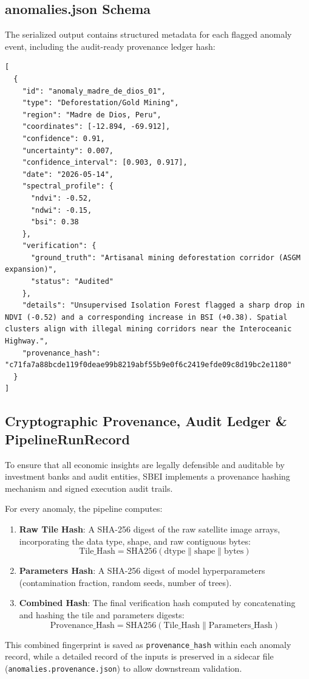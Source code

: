 \subsection{anomalies.json Schema}
The serialized output contains structured metadata for each flagged anomaly event, including the audit-ready provenance ledger hash:
\begin{verbatim}
[
  {
    "id": "anomaly_madre_de_dios_01",
    "type": "Deforestation/Gold Mining",
    "region": "Madre de Dios, Peru",
    "coordinates": [-12.894, -69.912],
    "confidence": 0.91,
    "uncertainty": 0.007,
    "confidence_interval": [0.903, 0.917],
    "date": "2026-05-14",
    "spectral_profile": {
      "ndvi": -0.52,
      "ndwi": -0.15,
      "bsi": 0.38
    },
    "verification": {
      "ground_truth": "Artisanal mining deforestation corridor (ASGM expansion)",
      "status": "Audited"
    },
    "details": "Unsupervised Isolation Forest flagged a sharp drop in NDVI (-0.52) and a corresponding increase in BSI (+0.38). Spatial clusters align with illegal mining corridors near the Interoceanic Highway.",
    "provenance_hash": "c71fa7a88bcde119f0deae99b8219abf55b9e0f6c2419efde09c8d19bc2e1180"
  }
]
\end{verbatim}

\subsection{Cryptographic Provenance, Audit Ledger \& PipelineRunRecord}
To ensure that all economic insights are legally defensible and auditable by investment banks and audit entities, SBEI implements a provenance hashing mechanism and signed execution audit trails. 

For every anomaly, the pipeline computes:
\begin{enumerate}
  \item \textbf{Raw Tile Hash}: A SHA-256 digest of the raw satellite image arrays, incorporating the data type, shape, and raw contiguous bytes:
   $$\text{Tile\_Hash} = \text{SHA256}(\text{dtype} \parallel \text{shape} \parallel \text{bytes})$$
  \item \textbf{Parameters Hash}: A SHA-256 digest of model hyperparameters (contamination fraction, random seeds, number of trees).
  \item \textbf{Combined Hash}: The final verification hash computed by concatenating and hashing the tile and parameters digests:
   $$\text{Provenance\_Hash} = \text{SHA256}(\text{Tile\_Hash} \parallel \text{Parameters\_Hash})$$

\end{enumerate}
This combined fingerprint is saved as \texttt{provenance\_hash} within each anomaly record, while a detailed record of the inputs is preserved in a sidecar file (\texttt{anomalies.provenance.json}) to allow downstream validation.

